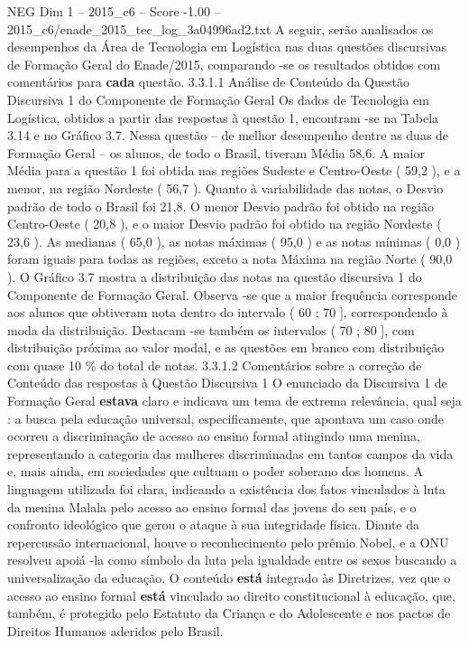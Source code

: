 \begin{textsample}{NEG Dim 1 – 2015\_c6 – Score -1.00 – 2015\_c6/enade\_2015\_tec\_log\_3a04996ad2.txt}
A seguir, serão analisados os desempenhos da Área de Tecnologia em Logística nas duas questões discursivas de Formação Geral do Enade/2015, comparando -se os resultados obtidos com comentários para \textbf{cada} questão. 3.3.1.1 Análise de Conteúdo da Questão Discursiva 1 do Componente de Formação Geral Os dados de Tecnologia em Logística, obtidos a partir das respostas à questão 1, encontram -se na Tabela 3.14 e no Gráfico 3.7.
Nessa questão – de melhor desempenho dentre as duas de Formação Geral – os alunos, de todo o Brasil, tiveram Média 58,6.
A maior Média para a questão 1 foi obtida nas regiões Sudeste e Centro-Oeste ( 59,2 ), e a menor, na região Nordeste ( 56,7 ).
Quanto à variabilidade das notas, o Desvio padrão de todo o Brasil foi 21,8.
O menor Desvio padrão foi obtido na região Centro-Oeste ( 20,8 ), e o maior Desvio padrão foi obtido na região Nordeste ( 23,6 ).
As medianas ( 65,0 ), as notas máximas ( 95,0 ) e as notas mínimas ( 0,0 ) foram iguais para todas as regiões, exceto a nota Máxima na região Norte ( 90,0 ).
O Gráfico 3.7 mostra a distribuição das notas na questão discursiva 1 do Componente de Formação Geral.
Observa -se que a maior frequência corresponde aos alunos que obtiveram nota dentro do intervalo ( 60 ; 70 ], correspondendo à moda da distribuição.
Destacam -se também os intervalos ( 70 ; 80 ], com distribuição próxima ao valor modal, e as questões em branco com distribuição com quase 10 \% do total de notas. 3.3.1.2 Comentários sobre a correção de Conteúdo das respostas à Questão Discursiva 1 O enunciado da Discursiva 1 de Formação Geral \textbf{estava} claro e indicava um tema de extrema relevância, qual seja : a busca pela educação universal, especificamente, que apontava um caso onde ocorreu a discriminação de acesso ao ensino formal atingindo uma menina, representando a categoria das mulheres discriminadas em tantos campos da vida e, mais ainda, em sociedades que cultuam o poder soberano dos homens.
A linguagem utilizada foi clara, indicando a existência dos fatos vinculados à luta da menina Malala pelo acesso ao ensino formal das jovens do seu país, e o confronto ideológico que gerou o ataque à sua integridade física.
Diante da repercussão internacional, houve o reconhecimento pelo prêmio Nobel, e a ONU resolveu apoiá -la como símbolo da luta pela igualdade entre os sexos buscando a universalização da educação.
O conteúdo \textbf{está} integrado às Diretrizes, vez que o acesso ao ensino formal \textbf{está} vinculado ao direito constitucional à educação, que, também, é protegido pelo Estatuto da Criança e do Adolescente e nos pactos de Direitos Humanos aderidos pelo Brasil.

\end{textsample}
